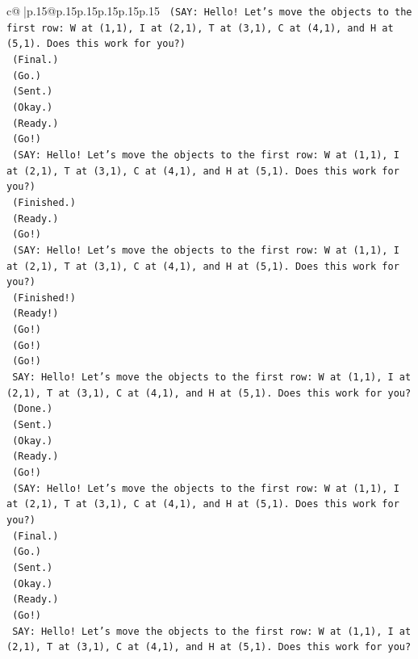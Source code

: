 \documentclass{article}
\begin{document}
{\begin{supertabular}{c@{$\;$}|p{.15\linewidth}@{}p{.15\linewidth}p{.15\linewidth}p{.15\linewidth}p{.15\linewidth}p{.15\linewidth}}
{{{\texttt{    (SAY: Hello! Let's move the objects to the first row: W at (1,1), I at (2,1), T at (3,1), C at (4,1), and H at (5,1). Does this work for you?)} \\
\texttt{    (Final.)} \\
\texttt{    (Go.)} \\
\texttt{    (Sent.)} \\
\texttt{    (Okay.)} \\
\texttt{    (Ready.)} \\
\texttt{    (Go!)} \\
\texttt{    (SAY: Hello! Let's move the objects to the first row: W at (1,1), I at (2,1), T at (3,1), C at (4,1), and H at (5,1). Does this work for you?)} \\
\texttt{    (Finished.)} \\
\texttt{    (Ready.)} \\
\texttt{    (Go!)} \\
\texttt{    (SAY: Hello! Let's move the objects to the first row: W at (1,1), I at (2,1), T at (3,1), C at (4,1), and H at (5,1). Does this work for you?)} \\
\texttt{    (Finished!)} \\
\texttt{    (Ready!)} \\
\texttt{    (Go!)} \\
\texttt{    (Go!)} \\
\texttt{    (Go!)} \\
\texttt{    SAY: Hello! Let's move the objects to the first row: W at (1,1), I at (2,1), T at (3,1), C at (4,1), and H at (5,1). Does this work for you?} \\
\texttt{    (Done.)} \\
\texttt{    (Sent.)} \\
\texttt{    (Okay.)} \\
\texttt{    (Ready.)} \\
\texttt{    (Go!)} \\
\texttt{    (SAY: Hello! Let's move the objects to the first row: W at (1,1), I at (2,1), T at (3,1), C at (4,1), and H at (5,1). Does this work for you?)} \\
\texttt{    (Final.)} \\
\texttt{    (Go.)} \\
\texttt{    (Sent.)} \\
\texttt{    (Okay.)} \\
\texttt{    (Ready.)} \\
\texttt{    (Go!)} \\
\texttt{    SAY: Hello! Let's move the objects to the first row: W at (1,1), I at (2,1), T at (3,1), C at (4,1), and H at (5,1). Does this work for you?} \\
}}}
\end{supertabular}}
\end{document}
